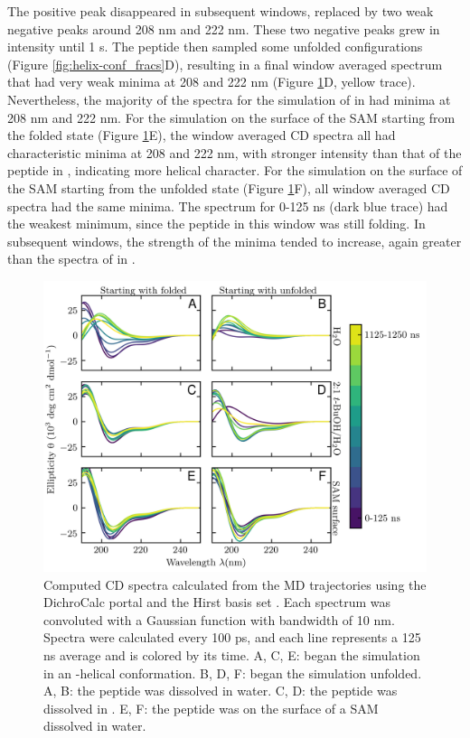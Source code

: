 The positive peak disappeared in subsequent windows, replaced by two weak negative peaks around 208 nm and 222 nm. 
These two negative peaks grew in intensity until 1 \textmu{}s. 
The peptide then sampled some unfolded configurations (Figure \ref{fig:helix-conf_fracs}D), resulting in a final window averaged spectrum that had very weak minima at 208 and 222 nm (Figure \ref{fig:helix-calc_cd}D, yellow trace). 
Nevertheless, the majority of the spectra for the simulation of \pep{} in \tbawat{} had minima at 208 nm and 222 nm. 
For the simulation on the surface of the SAM starting from the folded state (Figure \ref{fig:helix-calc_cd}E), the window averaged CD spectra all had characteristic minima at 208 and 222 nm, with stronger intensity than that of the peptide in \tbawat{}, indicating more helical character. 
For the simulation on the surface of the SAM starting from the unfolded state (Figure \ref{fig:helix-calc_cd}F), all window averaged CD spectra had the same minima. 
The spectrum for 0-125 ns (dark blue trace) had the weakest minimum, since the peptide in this window was still folding. 
In subsequent windows, the strength of the minima tended to increase, again greater than the spectra of \pep{} in \tbawat{}.

\begin{figure}
    \center
    \includegraphics[width=\double]{figures-helix/cd_spectra_hirst_time_resolved.png}
    \caption[Computed CD spectra of \pep{} in three solvent environments]{
        Computed CD spectra calculated from the MD trajectories using the DichroCalc portal and the Hirst basis set \cite{Hirst1998, Besley1999}.
        Each spectrum was convoluted with a Gaussian function with bandwidth of 10 nm. 
        Spectra were calculated every 100 ps, and each line represents a 125 ns average and is colored by its time. 
        A, C, E: \pep{} began the simulation in an \textalpha{}-helical conformation. 
        B, D, F: \pep{} began the simulation unfolded. 
        A, B: the peptide was dissolved in water. 
        C, D: the peptide was dissolved in \tbawat{}. 
        E, F: the peptide was on the surface of a SAM dissolved in water.
    }
    \label{fig:helix-calc_cd}
\end{figure}


